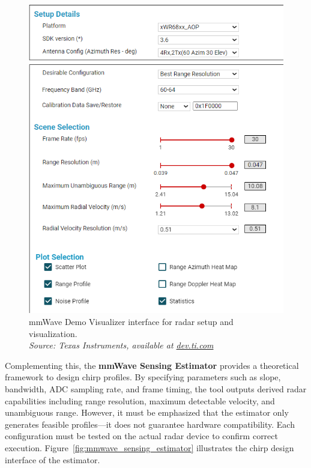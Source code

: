 \begin{figure}[!htbp]
    \centering
    \includegraphics[width=0.9\linewidth]{images/mmWaveDemoVisualizer.png}
    \caption{mmWave Demo Visualizer interface for radar setup and visualization.\\
    \textit{Source: Texas Instruments, available at \href{https://dev.ti.com/gallery/view/mmwave/mmWave_Demo_Visualizer/ver/3.6.0/}{dev.ti.com}}}
    \label{fig:mmwave_demo_visualizer}
\end{figure}

Complementing this, the \textbf{mmWave Sensing Estimator} \cite{mmwave_demo_output} provides a theoretical framework to design chirp profiles.  
By specifying parameters such as slope, bandwidth, ADC sampling rate, and frame timing, the tool outputs derived radar capabilities including range resolution, maximum detectable velocity, and unambiguous range.  
However, it must be emphasized that the estimator only generates feasible profiles—it does not guarantee hardware compatibility.  
Each configuration must be tested on the actual radar device to confirm correct execution.  
Figure~\ref{fig:mmwave_sensing_estimator} illustrates the chirp design interface of the estimator.  

